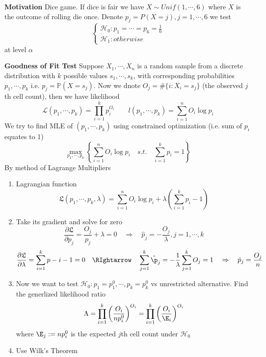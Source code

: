 \documentclass[11pt]{article}
\begin{document}
\begin{example}
  \textbf{Motivation} Dice game. If dice is fair we have $X \sim Unif(1, \cdots, 6)$ where $X$ is the outcome of rolling die once. Denote $p_j = P(X=j), j =  1,\cdots,6$ we test
  \[
    \begin{cases*}
      \mathcal{H}_0: p_1 = \cdots = p_6 = \frac{1}{6}\\
      \mathcal{H}_1: otherwise
    \end{cases*}
  \]
  at level $\alpha$
\end{example}


\begin{defn*}
  \textbf{Goodness of Fit Test} Suppose $X_1, \cdots, X_n$ is a random sample from a discrete distribution with $k$ possible values $s_1, \cdots, s_k$, with corresponding probabilities $p_1, \cdots, p_k$ i.e. $p_j = \mathbb{P}(X = s_j)$. Now we dnote $O_j = \# \{ i: X_i = s_j\}$ (the observed $j$th cell count), then we have likelihood
  \[
    \mathcal{L}(p_1, \cdots, p_k) = \prod_{i=1}^k p_i^{O_i} \quad \quad l(p_1, \cdots, p_k) = \sum_{i=1}^n O_i \log p_i
  \]
  We try to find MLE of $(p_1, \cdots, p_k)$ using constrained optimization (i.e. sum of $p_i$ equates to 1)
  \[
    \max_{p_1,\cdots,p_k} \left\{ \sum_{i=1}^n O_i \log p_i \quad s.t. \quad \sum_{i=1}^k p_i = 1 \right\}
  \]
  By method of Lagrange Multipliers
  \begin{enumerate}
    \item Lagrangian function
    \[
      \mathfrak{L}(p_1, \cdots, p_k, \lambda) = \sum_{i=1}^n O_i \log p_i + \lambda(\sum_{i=1}^k p_i - 1)
    \]
    \item Take its gradient and solve for zero
    \[
      \frac{\partial \mathfrak{L}}{\partial p_j} = \frac{O_j}{p_j} + \lambda = 0 \quad \Rightarrow \quad \hat{p}_j = - \frac{O_j}{\lambda}, j = 1, \cdots, k
    \]
    \[
      \frac{\partial \mathfrak{L}}{\partial \lambda} = \sum_{i=1}^k p-i  - 1 = 0 \quad \RIghtarrow \quad \sum_{j=1}^k \hat{\p}_j  = -\frac{1}{\lambda} \sum_{j=1}^k O_j = 1 \quad \Rightarrow\quad \hat{p}_j  = \frac{O_j}{n}
    \]
    \item Now we want to test $\mathcal{H}_0: p_1 = p_1^0, \cdots, p_k = p_k^0$ vs unrestricted alternative. Find the generlized likelihood ratio
    \[
      \Lambda = \prod_{i=1}^k \left( \frac{O_i}{np_i^0} \right)^{O_i} = \prod_{i=1}^k \left( \frac{O_i}{\E_i} \right)^{O_i}
    \]
    where $\E_j := np_i^0$ is the expected $j$th cell count under $\mathcal{H}_0$
    \item Use Wilk's Theorem

\end{enumerate}
\end{defn*}
\end{document}
